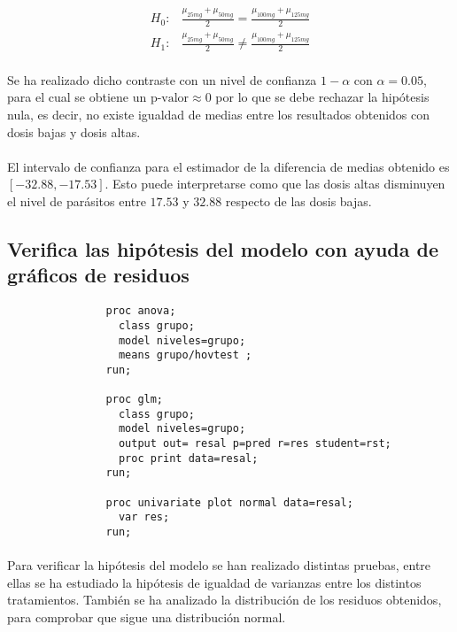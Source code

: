 \documentclass{article}
\begin{document}
      \begin{align}
        H_0:& \frac{\mu_{25mg} + \mu_{50mg}}{2} = \frac{\mu_{100mg} +\mu_{125mg}}{2} \\
        H_1:& \frac{\mu_{25mg} + \mu_{50mg}}{2} \neq \frac{\mu_{100mg} +\mu_{125mg}}{2}
      \end{align}

      \paragraph{}
      Se ha realizado dicho contraste con un nivel de confianza $1-\alpha$ con $\alpha = 0.05 $, para el cual se obtiene un $\text{p-valor}\approx 0$ por lo que se debe rechazar la hipótesis nula, es decir, no existe igualdad de medias entre los resultados obtenidos con dosis bajas y dosis altas.

      \paragraph{}
      El intervalo de confianza para el estimador de la diferencia de medias obtenido es $[-32.88, -17.53]$. Esto puede interpretarse como que las dosis altas disminuyen el nivel de parásitos entre $17.53$ y $32.88$ respecto de las dosis bajas.

    \subsection{Verifica las hipótesis del modelo con ayuda de gráficos de residuos}

      \begin{figure}[h]
        \centering
        \begin{verbatim}
          proc anova;
            class grupo;
            model niveles=grupo;
            means grupo/hovtest ;
          run;

          proc glm;
            class grupo;
            model niveles=grupo;
            output out= resal p=pred r=res student=rst;
            proc print data=resal;
          run;

          proc univariate plot normal data=resal;
            var res;
          run;
        \end{verbatim}
        \caption{}
        \label{code:sas_8}
      \end{figure}

      \paragraph{}
      Para verificar la hipótesis del modelo se han realizado distintas pruebas, entre ellas se ha estudiado la hipótesis de igualdad de varianzas entre los distintos tratamientos. También se ha analizado la distribución de los residuos obtenidos, para comprobar que sigue una distribución normal.
\end{document}
